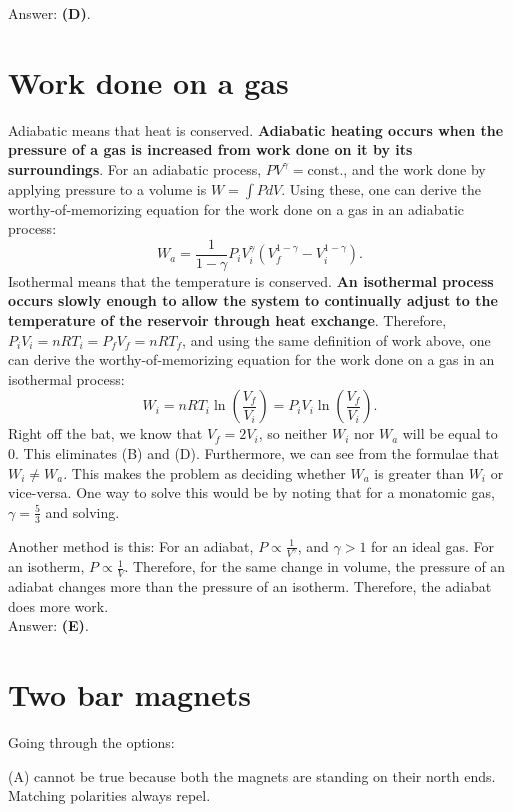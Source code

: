 \documentclass[11pt]{paper}
\newcommand{\answer}[1]{Answer: \textbf{(#1)}.}
\begin{document}
\answer{D}

\section{Work done on a gas}
Adiabatic means that heat is conserved.  \textbf{Adiabatic heating occurs when the pressure of a gas is increased from work done on it by its surroundings}. For an adiabatic process, $PV^\gamma = \text{const.}$, and the work done by applying pressure to a volume is $W = \int P dV$.  Using these, one can derive the worthy-of-memorizing equation for the work done on a gas in an adiabatic process:
\begin{equation}
W_{a} = \frac{1}{1-\gamma}P_iV_i^\gamma\left(V_f^{1-\gamma} - V_i^{1-\gamma}\right).
\end{equation}
Isothermal means that the temperature is conserved.  \textbf{An isothermal process occurs slowly enough to allow the system to continually adjust to the temperature of the reservoir through heat exchange}. Therefore, $P_i V_i = n R T_i = P_f V_f = n R T_f$, and using the same definition of work above, one can derive the worthy-of-memorizing equation for the work done on a gas in an isothermal process:
\begin{equation}
W_{i} = n R T_i \ln \left( \frac{V_f}{V_i}\right) = P_i V_i \ln \left( \frac{V_f}{V_i}\right).
\end{equation}
Right off the bat, we know that $V_f = 2V_i$, so neither $W_i$ nor $W_a$ will be equal to 0.  This eliminates (B) and (D).  Furthermore, we can see from the formulae that $W_i \neq W_a$.  This makes the problem as deciding whether $W_a$ is greater than $W_i$ or vice-versa.  One way to solve this would be by noting that for a monatomic gas, $\gamma = \frac{5}{3}$ and solving.

Another method is this:  For an adiabat, $P \propto \frac{1}{V^\gamma}$, and $\gamma > 1$ for an ideal gas.  For an isotherm, $P \propto \frac{1}{V}$.  Therefore, for the same change in volume, the pressure of an adiabat changes more than the pressure of an isotherm.  Therefore, the adiabat does more work.\\

\answer{E}

\section{Two bar magnets}
Going through the options:

(A) cannot be true because both the magnets are standing on their north ends.  Matching polarities always repel.
\end{document}
